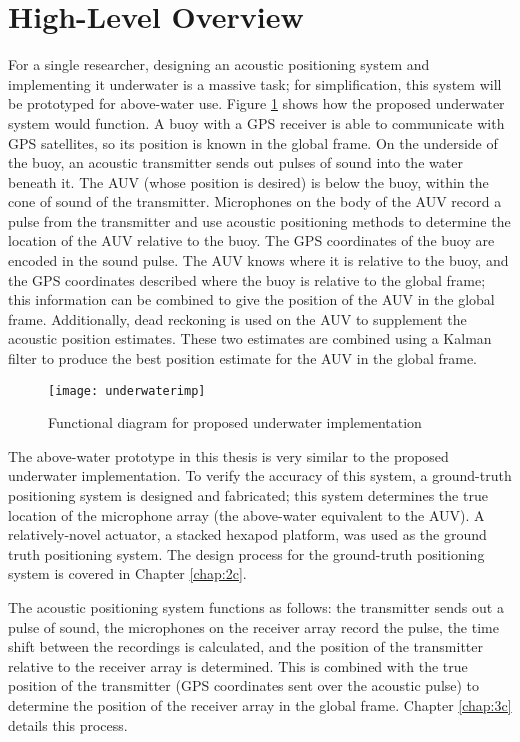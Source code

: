 \documentclass[12pt,a4paper]{report}
\begin{document}
\section{High-Level Overview} \label{sec:1s3}
For a single researcher, designing an acoustic positioning system and implementing it underwater is a massive task; for simplification, this system will be prototyped for above-water use. Figure \ref{fig:underwaterimp} shows how the proposed underwater system would function. A buoy with a GPS receiver is able to communicate with GPS satellites, so its position is known in the global frame. On the underside of the buoy, an acoustic transmitter sends out pulses of sound into the water beneath it. The AUV (whose position is desired) is below the buoy, within the cone of sound of the transmitter. Microphones on the body of the AUV record a pulse from the transmitter and use acoustic positioning methods to determine the location of the AUV relative to the buoy. The GPS coordinates of the buoy are encoded in the sound pulse. The AUV knows where it is relative to the buoy, and the GPS coordinates described where the buoy is relative to the global frame; this information can be combined to give the position of the AUV in the global frame. Additionally, dead reckoning is used on the AUV to supplement the acoustic position estimates. These two estimates are combined using a Kalman filter to produce the best position estimate for the AUV in the global frame.

\begin{figure}[htbp]
	\centering
	\texttt{[image: underwaterimp]}
	\caption{Functional diagram for proposed underwater implementation}
	\label{fig:underwaterimp}
\end{figure}

The above-water prototype in this thesis is very similar to the proposed underwater implementation. To verify the accuracy of this system, a ground-truth positioning system is designed and fabricated; this system determines the true location of the microphone array (the above-water equivalent to the AUV). A relatively-novel actuator, a stacked hexapod platform, was used as the ground truth positioning system. The design process for the ground-truth positioning system is covered in Chapter \ref{chap:2c}.

The acoustic positioning system functions as follows: the transmitter sends out a pulse of sound, the microphones on the receiver array record the pulse, the time shift between the recordings is calculated, and the position of the transmitter relative to the receiver array is determined. This is combined with the true position of the transmitter (GPS coordinates sent over the acoustic pulse) to determine the position of the receiver array in the global frame. Chapter \ref{chap:3c} details this process.
\end{document}
